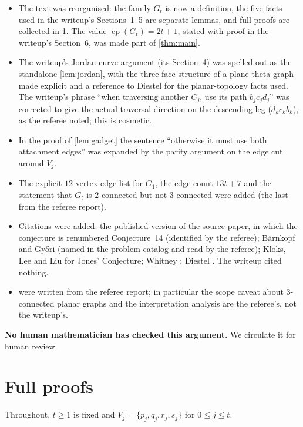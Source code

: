 \documentclass[11pt,a4paper]{article}
\theoremstyle{plain}
\theoremstyle{definition}
\theoremstyle{remark}
\providecommand{\tightlist}{\setlength{\itemsep}{0pt}\setlength{\parskip}{0pt}}
\newcommand{\cp}{\operatorname{cp}}
\newcommand{\Gtt}{G_t}
\begin{document}
\begin{itemize}\tightlist
\item The text was reorganised: the family $\Gtt$ is now a definition, the five facts used in the writeup's Sections~1--5 are separate lemmas, and full proofs are collected in \cref{app:proofs}. The value $\cp(\Gtt)=2t+1$, stated with proof in the writeup's Section~6, was made part of \cref{thm:main}.
\item The writeup's Jordan-curve argument (its Section~4) was spelled out as the standalone \cref{lem:jordan}, with the three-face structure of a plane theta graph made explicit and a reference to Diestel \cite{Diestel17} for the planar-topology facts used. The writeup's phrase ``when traversing another $C_j$, use its path $b_jc_jd_j$'' was corrected to give the actual traversal direction on the descending leg ($d_kc_kb_k$), as the referee noted; this is cosmetic.
\item In the proof of \cref{lem:gadget} the sentence ``otherwise it must use both attachment edges'' was expanded by the parity argument on the edge cut around $V_j$.
\item The explicit $12$-vertex edge list for $G_1$, the edge count $13t+7$ and the statement that $\Gtt$ is $2$-connected but not $3$-connected were added (the last from the referee report).
\item Citations were added: the published version \cite{BDMNPP21} of the source paper, in which the conjecture is renumbered Conjecture~14 (identified by the referee); Bärnkopf and Győri \cite{BG24} (named in the problem catalog and read by the referee); Kloks, Lee and Liu \cite{KLL02} for Jones' Conjecture; Whitney \cite{Whitney32}; Diestel \cite{Diestel17}. The writeup cited nothing.
\item {} were written from the referee report; in particular the scope caveat about $3$-connected planar graphs and the interpretation analysis are the referee's, not the writeup's.
\end{itemize}
\textbf{No human mathematician has checked this argument.} We circulate it for human review.

\appendix

\section{Full proofs}\label{app:proofs}

Throughout, $t\ge1$ is fixed and $V_j=\{p_j,q_j,r_j,s_j\}$ for $0\le j\le t$.
\end{document}
